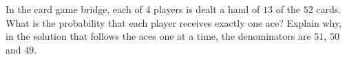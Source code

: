 In the card game bridge, each of $4$ players is dealt a hand of $13$ of the $52$ cards. What is the probability that each player receives exactly one ace? Explain why, in the solution that follows the aces one at a time, the denominators are $51$, $50$ and $49$.
